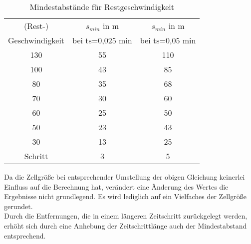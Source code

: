 \begin{table}[ht]
\begin{center}
\setlength{\tabcolsep}{0.5em} %
{\renewcommand{\arraystretch}{1.2}%
\begin{tabular}{| c  c  c |}
\hline 
(Rest-) & $ s_{min} $ in m & $ s_{min} $ in m  \\ 
Geschwindigkeit & bei ts=0,025 min & bei ts=0,05 min \\ \hline 
130 & 55 & 110 \\ 
100 & 43 & 85 \\ 
80 & 35 & 68 \\ 
70 & 30 & 60 \\ 
60 & 25 & 50 \\ 
50 & 23 & 43 \\ 
30 & 13 & 25 \\ 
Schritt & 3 & 5 \\ \hline
\end{tabular}
}
\caption{Mindestabstände für Restgeschwindigkeit}
\label{tab:restgeschw-abstand}
\end{center}
\end{table}

Da die Zellgröße bei entsprechender Umstellung der obigen Gleichung keinerlei Einfluss auf die Berechnung hat, verändert eine Änderung des Wertes die Ergebnisse nicht grundlegend. 
Es wird lediglich auf ein Vielfaches der Zellgröße gerundet.
\\
Durch die Entfernungen, die in einem längeren Zeitschritt zurückgelegt werden, erhöht sich durch eine Anhebung der Zeitschrittlänge auch der Mindestabstand entsprechend.

